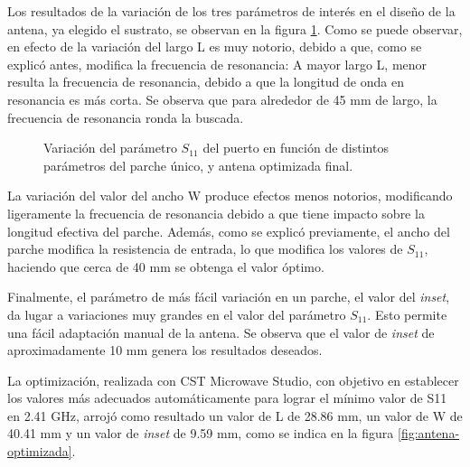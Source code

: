 Los resultados de la variación de los tres parámetros de interés en el diseño de la antena, ya elegido el sustrato, se observan en la figura \ref{fig:simulaciones-microstrip-1parche}. Como se puede observar, en efecto de la variación del largo L es muy notorio, debido a que, como se explicó antes, modifica la frecuencia de resonancia: A mayor largo L, menor resulta la frecuencia de resonancia, debido a que la longitud de onda en resonancia es más corta. Se observa que para alrededor de 45 mm de largo, la frecuencia de resonancia ronda la buscada.

\begin{figure}[H]
	\centering 
	\hspace{30pt}
	\hspace{30pt}
	\caption{Variación del parámetro $S_{11}$ del puerto en función de distintos parámetros del parche único, y antena optimizada final.}
	\label{fig:simulaciones-microstrip-1parche}
\end{figure}

La variación del valor del ancho W produce efectos menos notorios, modificando ligeramente la frecuencia de resonancia debido a que tiene impacto sobre la longitud efectiva del parche. Además, como se explicó previamente, el ancho del parche modifica la resistencia de entrada, lo que modifica  los valores de $S_{11}$, haciendo que cerca de 40 mm se obtenga el valor óptimo.

Finalmente, el parámetro de más fácil variación en un parche, el valor del \textit{inset}, da lugar a variaciones muy grandes en el valor del parámetro $S_{11}$. Esto permite una fácil adaptación manual de la antena. Se observa que el valor de \textit{inset} de aproximadamente 10 mm genera los resultados deseados.

La optimización, realizada con CST Microwave Studio, con objetivo en establecer los valores más adecuados automáticamente para lograr el mínimo valor de S11 en 2.41 GHz, arrojó como resultado un valor de L de 28.86 mm, un valor de W de 40.41 mm y un valor de \textit{inset} de 9.59 mm, como se indica en la figura \ref{fig:antena-optimizada}.

